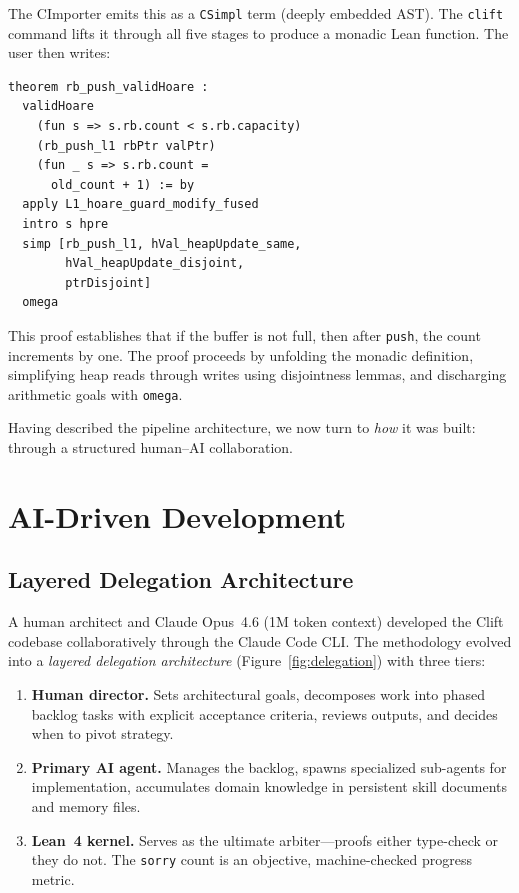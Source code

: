 \documentclass[sigconf,nonacm,screen]{acmart}
\begin{document}
The CImporter emits this as a \texttt{CSimpl} term (deeply embedded
AST). The \texttt{clift} command lifts it through all five stages to
produce a monadic Lean function. The user then writes:

\begin{lstlisting}[language=Lean]
theorem rb_push_validHoare :
  validHoare
    (fun s => s.rb.count < s.rb.capacity)
    (rb_push_l1 rbPtr valPtr)
    (fun _ s => s.rb.count =
      old_count + 1) := by
  apply L1_hoare_guard_modify_fused
  intro s hpre
  simp [rb_push_l1, hVal_heapUpdate_same,
        hVal_heapUpdate_disjoint,
        ptrDisjoint]
  omega
\end{lstlisting}

This proof establishes that if the buffer is not full, then after
\texttt{push}, the count increments by one. The proof proceeds by
unfolding the monadic definition, simplifying heap reads through
writes using disjointness lemmas, and discharging arithmetic goals
with \texttt{omega}.


Having described the pipeline architecture, we now turn to \emph{how}
it was built: through a structured human--AI collaboration.

\section{AI-Driven Development}



\subsection{Layered Delegation Architecture}

A human architect and Claude Opus~4.6 (1M token context) developed
the Clift codebase collaboratively through the Claude Code CLI\@. The methodology evolved into a
\emph{layered delegation architecture} (Figure~\ref{fig:delegation})
with three tiers:

\begin{enumerate}
\item \textbf{Human director.} Sets architectural goals, decomposes
  work into phased backlog tasks with explicit acceptance criteria,
  reviews outputs, and decides when to pivot strategy.
\item \textbf{Primary AI agent.} Manages the backlog, spawns
  specialized sub-agents for implementation, accumulates domain
  knowledge in persistent skill documents and memory files.
\item \textbf{Lean~4 kernel.} Serves as the ultimate arbiter---proofs
  either type-check or they do not. The \texttt{sorry} count is an
  objective, machine-checked progress metric.
\end{enumerate}
\end{document}
